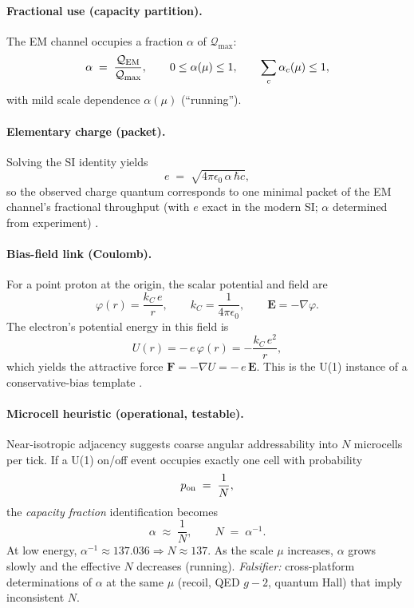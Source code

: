 \documentclass[11pt,oneside]{article}
\begin{document}
\paragraph{Fractional use (capacity partition).}
The EM channel occupies a fraction $\alpha$ of $\mathcal Q_{\max}$:
\begin{equation}
\alpha \;=\; \frac{\mathcal Q_{\rm EM}}{\mathcal Q_{\max}}, \qquad
0\le \alpha(\mu)\le 1,\qquad \sum_c \alpha_c(\mu)\le 1,
\end{equation}
with mild scale dependence $\alpha(\mu)$ (``running'').

\paragraph{Elementary charge (packet).}
Solving the SI identity yields
\begin{equation}
e \;=\; \sqrt{4\pi\epsilon_0\,\alpha\,\hbar c},
\end{equation}
so the observed charge quantum corresponds to one minimal packet of the EM channel's fractional throughput (with $e$ exact in the modern SI; $\alpha$ determined from experiment) \cite{bipm2019si,tiesinga2021codata}.

\paragraph{Bias-field link (Coulomb).}
For a point proton at the origin, the scalar potential and field are
\begin{equation}
\varphi(r)=\frac{k_C\,e}{r},\qquad k_C=\frac{1}{4\pi\epsilon_0},\qquad
\mathbf E=-\nabla\varphi.
\end{equation}
The electron’s potential energy in this field is
\begin{equation}
U(r)=-\,e\,\varphi(r)=-\frac{k_C\,e^2}{r},
\end{equation}
which yields the attractive force $\mathbf F=-\nabla U=-\,e\,\mathbf E$.
This is the U(1) instance of a conservative-bias template \cite{coulomb1785,griffiths2013electrodynamics}.

\paragraph{Microcell heuristic (operational, testable).}
Near-isotropic adjacency suggests coarse angular addressability into $N$ microcells per tick. If a U(1) on/off event occupies exactly one cell with probability
\begin{equation}
p_{\rm on} \;=\; \frac{1}{N},
\end{equation}
the \emph{capacity fraction} identification becomes
\begin{equation}
\alpha \;\approx\; \frac{1}{N}, \qquad N\;=\;\alpha^{-1}.
\end{equation}
At low energy, $\alpha^{-1}\!\approx\!137.036\Rightarrow N\!\approx\!137$. As the scale $\mu$ increases, $\alpha$ grows slowly and the effective $N$ decreases (running). \emph{Falsifier:} cross-platform determinations of $\alpha$ at the same $\mu$ (recoil, QED \(g\!-\!2\), quantum Hall) that imply inconsistent $N$.
\end{document}
